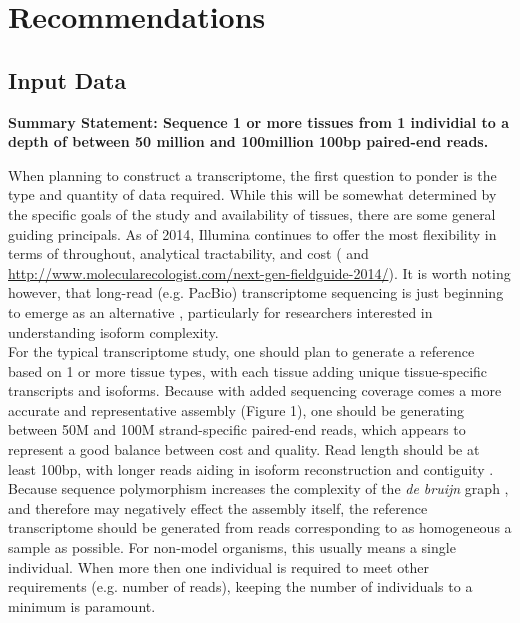 \section*{Recommendations}

\subsection{Input Data}
\begin{center}
\bf{Summary Statement: Sequence 1 or more tissues from 1 individial to a depth of between 50 million and 100million 100bp paired-end reads.}
\end{center}
When planning to construct a transcriptome, the first question to ponder is the type and quantity of data required. While this will be somewhat determined by the specific goals of the study and availability of tissues, there are some general guiding principals. As of 2014, Illumina continues to offer the most flexibility in terms of throughout, analytical tractability, and cost (\citep{Glenn:2011gy} and \url{http://www.molecularecologist.com/next-gen-fieldguide-2014/}). It is worth noting however, that long-read (e.g. PacBio) transcriptome sequencing is just beginning to emerge as an alternative \citep{Au:2013hp}, particularly for researchers interested in understanding isoform complexity. \\

For the typical transcriptome study, one should plan to generate a reference based on 1 or more tissue types, with each tissue adding unique tissue-specific transcripts and isoforms. Because with added sequencing coverage comes a more accurate and representative assembly (Figure 1), one should be generating between 50M and 100M strand-specific paired-end reads, which appears to represent a good balance between cost and quality. Read length should be at least 100bp, with longer reads aiding in isoform reconstruction and contiguity \citep{Garber:2011gp}. Because sequence polymorphism increases the complexity of the \textit{de bruijn} graph \citep{Iqbal:2012fx,Paszkiewicz:2010dla}, and therefore may negatively effect the assembly itself, the reference transcriptome should be generated from reads corresponding to as homogeneous a sample as possible. For non-model organisms, this usually means a single individual. When more then one individual is required to meet other requirements (e.g. number of reads), keeping the number of individuals to a minimum is paramount. \\

